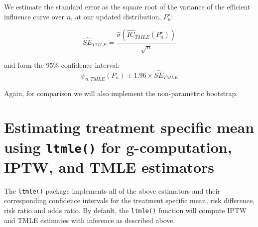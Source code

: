 \documentclass[answers]{exam}
\begin{document}
\begin{enumerate}
We estimate the standard error as the square root of the variance of the efficient influence curve over $n$, at our updated distribution, $P_{n}^{\star}$:

\[
\hat{SE}_{TMLE}=\frac{\hat{\sigma}\left(\hat{IC}_{TMLE}(P_{n}^{\star})\right)}{\sqrt{n}}
\]

and form the $95\%$ confidence interval:
\[
\hat{\psi}_{n, TMLE}(P_{n})\pm 1.96\times \hat{SE}_{TMLE}
\]

Again, for comparison we will also implement the non-parametric bootstrap.

\end{enumerate}


\section{Estimating treatment specific mean using \texttt{ltmle()} for g-computation, IPTW, and TMLE estimators}

The \texttt{ltmle()} package implements all of the above estimators and their corresponding confidence intervals for the treatment specific mean, risk difference, risk ratio and odds ratio. By default, the \texttt{ltmle()} function will compute IPTW and TMLE estimates with inference as described above.
\end{document}
